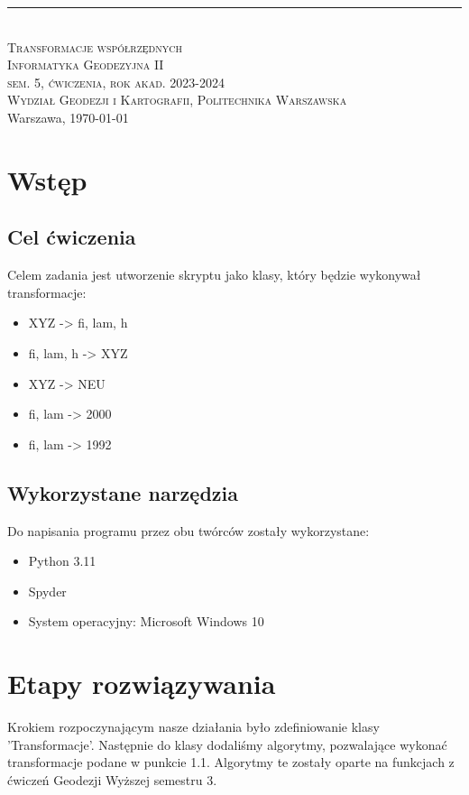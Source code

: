 \documentclass[10pt,a4paper]{article}
\newcommand{\titeReport}{Transformacje współrzędnych} %
\newcommand{\titleLecture}{Informatyka Geodezyjna II \\ sem. 5, ćwiczenia, rok akad. 2023-2024}
\newcommand{\faculty}{Wydział Geodezji i Kartografii}
\newcommand{\university}{Politechnika Warszawska}
\newcommand{\city}{Warszawa}
\begin{document}
	\begin{center} 
		\rule{\textwidth}{.5pt} \\
		\vspace{1.0cm}
		\Large \textsc{\titeReport}
		\vspace{0.5cm} \\  
		\large \textsc{\titleLecture}
		\vspace{0.5cm}\\
		\textsc{\faculty}, \textsc{\university}  \\ 
		\city, \today
	\end{center}

\tableofcontents
\newpage
\section{Wstęp}
\subsection{Cel ćwiczenia}
Celem zadania jest utworzenie skryptu jako klasy, który będzie wykonywał transformacje:
\begin{itemize}

	\item XYZ -> fi, lam, h
	\item fi, lam, h -> XYZ
	\item XYZ -> NEU
	\item fi, lam -> 2000
	\item fi, lam -> 1992
\end{itemize}
\subsection{Wykorzystane narzędzia}
Do napisania programu przez obu twórców zostały wykorzystane:
\begin{itemize}
	\item Python 3.11
	\item Spyder 
	\item System operacyjny: Microsoft Windows 10
\end{itemize}
\section{Etapy rozwiązywania}
Krokiem rozpoczynającym nasze działania było zdefiniowanie klasy 'Transformacje'. Następnie do klasy dodaliśmy algorytmy, pozwalające wykonać transformacje podane w punkcie 1.1. Algorytmy te zostały oparte na funkcjach z ćwiczeń Geodezji Wyższej  semestru 3.
\vspace{0.5 cm}
\end{document}
